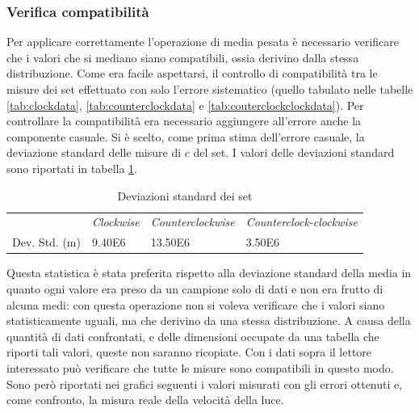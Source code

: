 \documentclass[a4paper,11pt]{article}
\begin{document}
	\subsubsection{Verifica compatibilità}
	Per applicare correttamente l'operazione di media pesata è necessario verificare che i valori che si mediano siano compatibili, ossia derivino dalla stessa distribuzione. Come era facile aspettarsi, il controllo di compatibilità tra le misure dei set effettuato con solo l'errore sistematico (quello tabulato nelle tabelle \ref{tab:clockdata}, \ref{tab:counterclockdata} e \ref{tab:couterclockclockdata}). Per controllare la compatibilità era necessario aggiungere all'errore anche la componente casuale. Si è scelto, come prima stima dell'errore casuale, la deviazione standard delle misure di $ c $ del set. I valori delle deviazioni standard sono riportati in tabella \ref{tab:setdevstd}.
	

	\begin{table}[htbp]
		\centering
		\caption{Deviazioni standard dei set}
		\vspace{0.1cm}
		\begin{tabular}{llll}
			\rowcolor[rgb]{ .741,  .843,  .933}       & \emph{Clockwise} & \emph{Counterclockwise} & \emph{Counterclock-clockwise} \\
			\rowcolor[rgb]{ .741,  .843,  .933} Dev. Std. (\si{\meter}) & \cellcolor[rgb]{ .859,  .859,  .859} \num{9.40E6} & \cellcolor[rgb]{ .859,  .859,  .859} \num{13.50E6} & \cellcolor[rgb]{ .859,  .859,  .859} \num{3.50E6} \\
		\end{tabular}%
		\label{tab:setdevstd}%
	\end{table}%
	
	Questa statistica è stata preferita rispetto alla deviazione standard della media in quanto ogni valore era preso da un campione solo di dati e non era frutto di alcuna medi: con questa operazione non si voleva verificare che i valori siano statisticamente uguali, ma che derivino da una stessa distribuzione. A causa della quantità di dati confrontati, e delle dimensioni occupate da una tabella che riporti tali valori, queste non saranno ricopiate. Con i dati sopra il lettore interessato può verificare che tutte le misure sono compatibili in questo modo. Sono però riportati nei grafici seguenti i valori misurati con gli errori ottenuti e, come confronto, la misura reale della velocità della luce.
	
\end{document}
